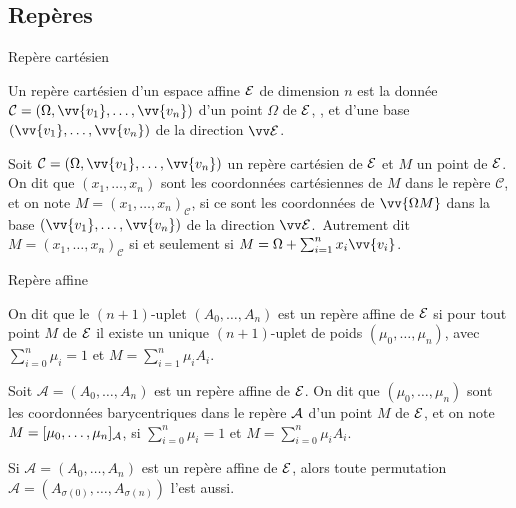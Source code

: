 \documentclass{m53beamer}
\begin{document}
\subsection{Repères}
  \begin{frame}{Repère cartésien}
    \begin{definition}
      Un \alert{repère cartésien} d'un espace affine $\mathcal{E}$ de dimension $n$ est la donnée $\mathcal{C}=(\Omega, \vv{v_{1}}, \ldots,\vv{v_{n}})$ d'un point $\Omega$ de $\mathcal{E}$, , et d'une base $(\vv{v_{1}}, \ldots,\vv{v_{n}})$ de la direction $\ev{E}$.
    \end{definition}\pause
    \begin{definition}
      Soit $\mathcal{C}=(\Omega, \vv{v_{1}}, \ldots,\vv{v_{n}})$ un repère cartésien de $\mathcal{E}$ et $M$ un point de $\mathcal{E}$. On dit que $(x_{1},\ldots,x_{n})$ sont les \alert{coordonnées cartésiennes} de $M$ dans le repère $\mathcal{C}$, et on note $M=(x_{1},\ldots,x_{n})_{\mathcal{C}}$, si ce sont les coordonnées de $\vv{\Omega M}$ dans la base $(\vv{v_{1}}, \ldots,\vv{v_{n}})$ de la direction $\ev{E}$.\pause\ Autrement dit $M=(x_{1},\ldots,x_{n})_{\mathcal{C}}$ si et seulement si $M=\Omega+\sum_{i=1}^{n}x_{i}\vv{v_{i}}$.
    \end{definition}
  \end{frame}
  \begin{frame}{Repère affine}
    \begin{definition}
      On dit que le $(n+1)$-uplet $(A_{0},\ldots,A_{n})$ est un \alert{repère affine} de $\mathcal{E}$ si pour tout point $M$ de $\mathcal{E}$ il existe un unique $(n+1)$-uplet de poids $(\mu_{0},\ldots,\mu_{n})$, avec $\sum_{i=0}^{n}\mu_{i}=1$ et $M=\sum_{i=1}^{n}\mu_{i}A_{i}$.
    \end{definition}\pause
    \begin{definition}
      Soit $\mathcal{A}=(A_{0},\ldots,A_{n})$ est un repère affine de $\mathcal{E}$. On dit que $(\mu_{0},\ldots,\mu_{n})$ sont les \alert{coordonnées barycentriques} dans le repère $\mathcal{A}$ d'un point $M$ de $\mathcal{E}$, et on note $M=[\mu_{0},\ldots,\mu_{n}]_{\mathcal{A}}$, si $\sum_{i=0}^{n}\mu_{i}=1$ et $M=\sum_{i=0}^{n}\mu_{i}A_{i}$.
    \end{definition}\pause
    \begin{remarque}
      Si $\mathcal{A}=(A_{0},\ldots,A_{n})$ est un repère affine de $\mathcal{E}$, alors toute permutation $\mathcal{A}=(A_{\sigma(0)},\ldots,A_{\sigma(n)})$ l'est aussi.
    \end{remarque}
  \end{frame}
\end{document}
